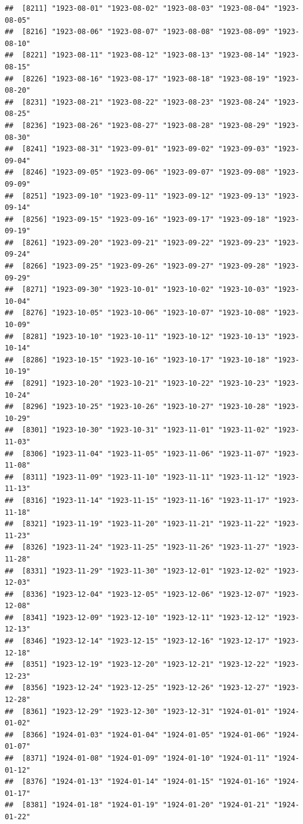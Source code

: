 \documentclass{article}\usepackage[]{graphicx}\usepackage[]{color}
\makeatletter
\newenvironment{kframe}{%
 \def\at@end@of@kframe{}%
 \ifinner\ifhmode%
  \def\at@end@of@kframe{\end{minipage}}%
  \begin{minipage}{\columnwidth}%
 \fi\fi%
 \def\FrameCommand##1{\hskip\@totalleftmargin \hskip-\fboxsep
 \colorbox{shadecolor}{##1}\hskip-\fboxsep
     \hskip-\linewidth \hskip-\@totalleftmargin \hskip\columnwidth}%
 \MakeFramed {\advance\hsize-\width
   \@totalleftmargin\z@ \linewidth\hsize
   \@setminipage}}%
 {\par\unskip\endMakeFramed%
 \at@end@of@kframe}
\newenvironment{knitrout}{}{} %
\makeatother
\begin{document}
\begin{description}
\begin{knitrout}
\begin{kframe}
\begin{verbatim}
##  [8211] "1923-08-01" "1923-08-02" "1923-08-03" "1923-08-04" "1923-08-05"
##  [8216] "1923-08-06" "1923-08-07" "1923-08-08" "1923-08-09" "1923-08-10"
##  [8221] "1923-08-11" "1923-08-12" "1923-08-13" "1923-08-14" "1923-08-15"
##  [8226] "1923-08-16" "1923-08-17" "1923-08-18" "1923-08-19" "1923-08-20"
##  [8231] "1923-08-21" "1923-08-22" "1923-08-23" "1923-08-24" "1923-08-25"
##  [8236] "1923-08-26" "1923-08-27" "1923-08-28" "1923-08-29" "1923-08-30"
##  [8241] "1923-08-31" "1923-09-01" "1923-09-02" "1923-09-03" "1923-09-04"
##  [8246] "1923-09-05" "1923-09-06" "1923-09-07" "1923-09-08" "1923-09-09"
##  [8251] "1923-09-10" "1923-09-11" "1923-09-12" "1923-09-13" "1923-09-14"
##  [8256] "1923-09-15" "1923-09-16" "1923-09-17" "1923-09-18" "1923-09-19"
##  [8261] "1923-09-20" "1923-09-21" "1923-09-22" "1923-09-23" "1923-09-24"
##  [8266] "1923-09-25" "1923-09-26" "1923-09-27" "1923-09-28" "1923-09-29"
##  [8271] "1923-09-30" "1923-10-01" "1923-10-02" "1923-10-03" "1923-10-04"
##  [8276] "1923-10-05" "1923-10-06" "1923-10-07" "1923-10-08" "1923-10-09"
##  [8281] "1923-10-10" "1923-10-11" "1923-10-12" "1923-10-13" "1923-10-14"
##  [8286] "1923-10-15" "1923-10-16" "1923-10-17" "1923-10-18" "1923-10-19"
##  [8291] "1923-10-20" "1923-10-21" "1923-10-22" "1923-10-23" "1923-10-24"
##  [8296] "1923-10-25" "1923-10-26" "1923-10-27" "1923-10-28" "1923-10-29"
##  [8301] "1923-10-30" "1923-10-31" "1923-11-01" "1923-11-02" "1923-11-03"
##  [8306] "1923-11-04" "1923-11-05" "1923-11-06" "1923-11-07" "1923-11-08"
##  [8311] "1923-11-09" "1923-11-10" "1923-11-11" "1923-11-12" "1923-11-13"
##  [8316] "1923-11-14" "1923-11-15" "1923-11-16" "1923-11-17" "1923-11-18"
##  [8321] "1923-11-19" "1923-11-20" "1923-11-21" "1923-11-22" "1923-11-23"
##  [8326] "1923-11-24" "1923-11-25" "1923-11-26" "1923-11-27" "1923-11-28"
##  [8331] "1923-11-29" "1923-11-30" "1923-12-01" "1923-12-02" "1923-12-03"
##  [8336] "1923-12-04" "1923-12-05" "1923-12-06" "1923-12-07" "1923-12-08"
##  [8341] "1923-12-09" "1923-12-10" "1923-12-11" "1923-12-12" "1923-12-13"
##  [8346] "1923-12-14" "1923-12-15" "1923-12-16" "1923-12-17" "1923-12-18"
##  [8351] "1923-12-19" "1923-12-20" "1923-12-21" "1923-12-22" "1923-12-23"
##  [8356] "1923-12-24" "1923-12-25" "1923-12-26" "1923-12-27" "1923-12-28"
##  [8361] "1923-12-29" "1923-12-30" "1923-12-31" "1924-01-01" "1924-01-02"
##  [8366] "1924-01-03" "1924-01-04" "1924-01-05" "1924-01-06" "1924-01-07"
##  [8371] "1924-01-08" "1924-01-09" "1924-01-10" "1924-01-11" "1924-01-12"
##  [8376] "1924-01-13" "1924-01-14" "1924-01-15" "1924-01-16" "1924-01-17"
##  [8381] "1924-01-18" "1924-01-19" "1924-01-20" "1924-01-21" "1924-01-22"

\end{verbatim}
\end{kframe}
\end{knitrout}
\end{description}
\end{document}

